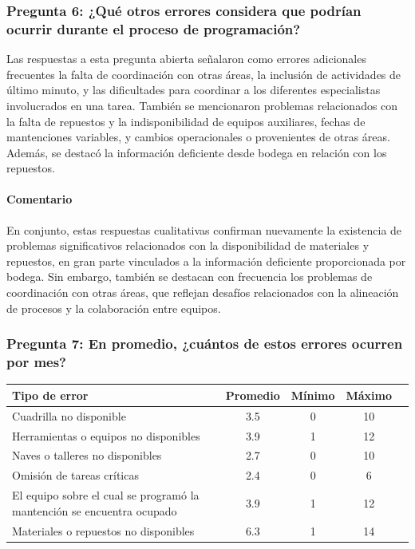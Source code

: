 \documentclass{article}
\begin{document}
\begin{appendix}
    \vspace{1.5em}
    \subsubsection*{Pregunta 6: ¿Qué otros errores considera que podrían ocurrir durante el proceso de programación?}
    
    Las respuestas a esta pregunta abierta señalaron como errores adicionales frecuentes la falta de coordinación con otras áreas, la inclusión de actividades de último minuto, y las dificultades para coordinar a los diferentes especialistas involucrados en una tarea. También se mencionaron problemas relacionados con la falta de repuestos y la indisponibilidad de equipos auxiliares, fechas de mantenciones variables, y cambios operacionales o provenientes de otras áreas. Además, se destacó la información deficiente desde bodega en relación con los repuestos.
    
    \paragraph{Comentario} En conjunto, estas respuestas cualitativas confirman nuevamente la existencia de problemas significativos relacionados con la disponibilidad de materiales y repuestos, en gran parte vinculados a la información deficiente proporcionada por bodega. Sin embargo, también se destacan con frecuencia los problemas de coordinación con otras áreas, que reflejan desafíos relacionados con la alineación de procesos y la colaboración entre equipos.
    
    \vspace{1.5em}
    \subsubsection*{Pregunta 7: En promedio, ¿cuántos de estos errores ocurren por mes?}
    
    \begin{table}[htbp]
        \centering
        \begin{tabular}{p{7cm}cccc}
            \toprule
            \textbf{Tipo de error} & \textbf{Promedio} & \textbf{Mínimo} & \textbf{Máximo} \\
            \midrule
            Cuadrilla no disponible & 3.5 & 0 & 10 \\
            Herramientas o equipos no disponibles & 3.9 & 1 & 12 \\
            Naves o talleres no disponibles & 2.7 & 0 & 10 \\
            Omisión de tareas críticas & 2.4 & 0 & 6 \\
            El equipo sobre el cual se programó la mantención se encuentra ocupado & 3.9 & 1 & 12 \\
            Materiales o repuestos no disponibles & 6.3 & 1 & 14 \\
            \bottomrule
        \end{tabular}
        \label{tab:errores_especificos}
    \end{table}
    

\end{appendix}
\end{document}
